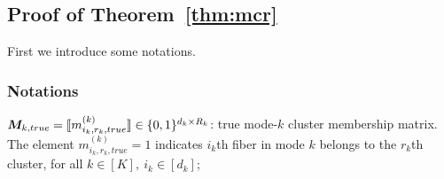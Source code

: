 \documentclass{article}
\begin{document}
\begin{appendices}


\subsection{Proof of Theorem~\ref{thm:mcr}}
First we introduce some notations.
\subsubsection{Notations}
$\boldsymbol{M}_{k,true}= \llbracket m_{i_k,r_k,true}^{(k)} \rrbracket \in \{0,1\}^{d_k\times R_k}$: true mode-$k$ cluster membership matrix. The element $m_{i_k,r_k,true}^{(k)}=1$ indicates $i_k$th fiber in mode $k$ belongs to the $r_k$th cluster, for all $k\in[K],~i_k\in[d_k]$;


\end{appendices}
\end{document}
